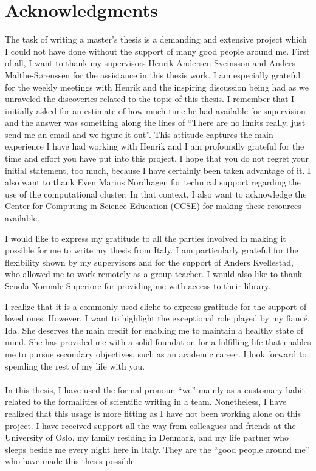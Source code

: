 \chapter*{Acknowledgments}
The task of writing a master's thesis is a demanding and extensive project which I could not have done without the support of many good people around me.
First of all, I want to thank my supervisors Henrik Andersen Sveinsson and
Anders Malthe-Sørenssen for the assistance in this thesis work. I am especially
grateful for the weekly meetings with Henrik and the inspiring discussion being
had as we unraveled the discoveries related to the topic of this thesis. I
remember that I initially asked for an estimate of how much time he had
available for supervision and the answer was something along the lines of
``There are no limits really, just send me an email and we figure it out''. This
attitude captures the main experience I have had working with Henrik and I am
profoundly grateful for the time and effort you have put into this project. I
hope that you do not regret your initial statement, too much, because I have certainly
been taken advantage of it. I also want to thank Even Marius Nordhagen for
technical support regarding the use of the computational cluster. In that context,
I also want to acknowledge the Center for Computing in Science Education (CCSE) for making these resources available. 

I would like to express my gratitude to all the parties involved in making it
possible for me to write my thesis from Italy. I am particularly grateful for
the flexibility shown by my supervisors and for the support of Anders
Kvellestad, who allowed me to work remotely as a group teacher. I would also
like to thank Scuola Normale Superiore for providing me with access to their
library.

I realize that it is a commonly used cliche to express gratitude for the support
of loved ones. However, I want to highlight the exceptional role played by my
fiancé, Ida. She deserves the main credit for enabling me to maintain a healthy
state of mind. She has provided me with a solid foundation for a fulfilling
life that enables me to pursue secondary objectives, such as an academic career.
I look forward to spending the rest of my life with you. \\
\\
In this thesis, I have used the formal pronoun ``we'' mainly as a customary habit
related to the formalities of scientific writing in a team. Nonetheless, I have realized that this usage is more fitting as I have not been working alone on this project. I have received support all the way from colleagues and friends at the University of Oslo, my family residing in Denmark, and my life partner who sleeps beside me every night here in Italy. They are the ``good people around me'' who have made this thesis possible.





